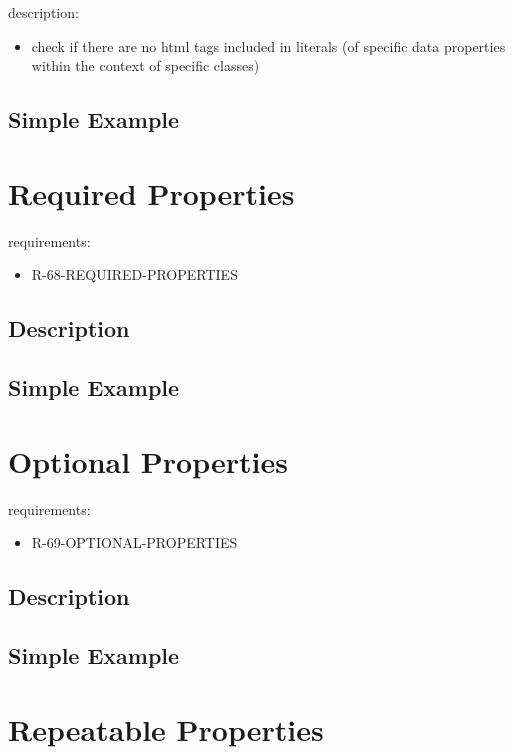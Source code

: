 \documentclass{llncs}
\begin{document}
description:

\begin{itemize}
	\item check if there are no html tags included in literals (of specific data properties within the context of specific classes)
\end{itemize}

\subsection{Simple Example}

\section{Required Properties}

requirements:

\begin{itemize}
	\item R-68-REQUIRED-PROPERTIES
\end{itemize}

\subsection{Description}

\subsection{Simple Example}

\section{Optional Properties}

requirements:

\begin{itemize}
	\item R-69-OPTIONAL-PROPERTIES
\end{itemize}

\subsection{Description}

\subsection{Simple Example}

\section{Repeatable Properties}
\end{document}
